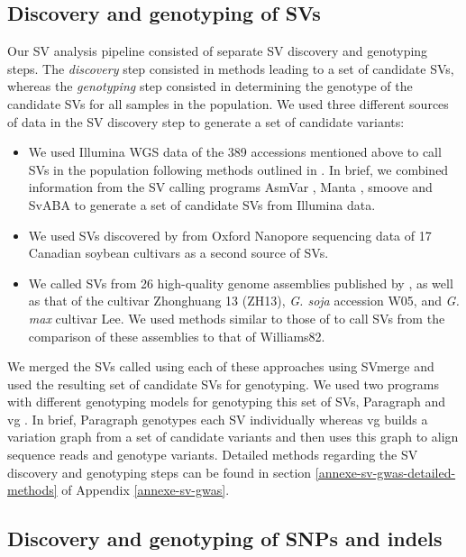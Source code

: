 \subsection{Discovery and genotyping of SVs}
\label{sv-gwas-sv-discovery-genotyping}

Our SV analysis pipeline consisted of separate SV discovery and genotyping steps.
The \emph{discovery} step consisted in methods leading to a set of candidate SVs,
whereas the \emph{genotyping} step consisted in determining the genotype
of the candidate SVs for all samples in the population. We used three different
sources of data in the SV discovery step to generate a set of candidate variants:

\begin{itemize}
	\item We used Illumina WGS data of the 389 accessions mentioned above
		to call SVs in the population following methods outlined
		in \cite{lemay2022}. In brief, we combined information from
		the SV calling programs AsmVar \citep{liu2015}, Manta \citep{chen2016},
		smoove \citep{pedersen2019} and SvABA \citep{wala2018} to generate
		a set of candidate SVs from Illumina data.
	\item We used SVs discovered by \cite{lemay2022} from Oxford Nanopore
		sequencing data of 17 Canadian soybean cultivars as a second
		source of SVs.
	\item We called SVs from 26 high-quality genome assemblies published by
		\cite{liu2020-pangenome}, as well as that of the cultivar Zhonghuang 13 (ZH13),
		\textit{G. soja} accession W05, and \textit{G. max} cultivar Lee.
		We used methods similar to those of \cite{liu2020-pangenome} to call
		SVs from the comparison of these assemblies to that of Williams82.
\end{itemize}

We merged the SVs called using each of these approaches using SVmerge
\citep{wong2010} and used the resulting set of candidate SVs for genotyping. We
used two programs with different genotyping models for genotyping this set of
SVs, Paragraph \citep{chen2019} and vg \citep{hickey2020}. In brief, Paragraph
genotypes each SV individually whereas vg builds a variation graph from a set
of candidate variants and then uses this graph to align sequence reads and
genotype variants.  Detailed methods regarding the SV discovery and genotyping
steps can be found in section \ref{annexe-sv-gwas-detailed-methods} of Appendix
\ref{annexe-sv-gwas}.

\subsection{Discovery and genotyping of SNPs and indels}
\label{sv-gwas-snp-discovery}

